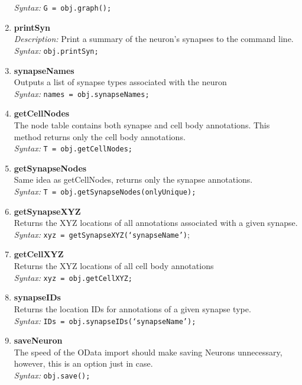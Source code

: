 \documentclass[12pt]{exam}
\begin{document}
\begin{enumerate}
		\textit{Syntax:} \texttt{G = obj.graph();}
		\item \textbf{printSyn}\\
		\textit{Description:} Print a summary of the neuron's synapses to the command line.\\
		\textit{Syntax:} \texttt{obj.printSyn;}
		\item \textbf{synapseNames}\\
		Outputs a list of synapse types associated with the neuron\\
		\textit{Syntax:} \texttt{names = obj.synapseNames;}
		\item \textbf{getCellNodes}\\
		The node table contains both synapse and cell body annotations. This method returns only the cell body annotations.\\
		\textit{Syntax:} \texttt{T = obj.getCellNodes;}
		\item \textbf{getSynapseNodes}\\
		Same idea as getCellNodes, returns only the synapse annotations.\\
		\textit{Syntax:} \texttt{T = obj.getSynapseNodes(onlyUnique);}
		\item \textbf{getSynapseXYZ}\\
		Returns the XYZ locations of all annotations associated with a given synapse.\\
		\textit{Syntax:} \texttt{xyz = getSynapseXYZ(`synapseName')};
		\item \textbf{getCellXYZ}\\
		Returns the XYZ locations of all cell body annotations\\
		\textit{Syntax:} \texttt{xyz = obj.getCellXYZ;}
		\item \textbf{synapseIDs}\\
		Returns the location IDs for annotations of a given synapse type.\\
		\textit{Syntax:} \texttt{IDs = obj.synapseIDs(`synapseName');}
		\item \textbf{saveNeuron}\\
		The speed of the OData import should make saving Neurons unnecessary, however, this is an option just in case.\\
		\textit{Syntax:} \texttt{obj.save();}
	\end{enumerate}
\end{document}
